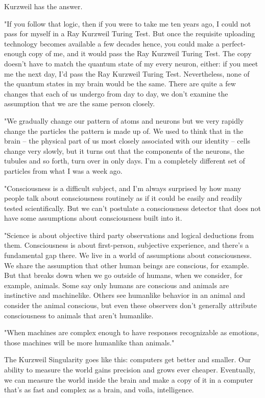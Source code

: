 Kurzweil has the answer.

"If you follow that logic, then if you were to take me ten years
ago, I could not pass for myself in a Ray Kurzweil Turing Test. But
once the requisite uploading technology becomes available a few
decades hence, you could make a perfect-enough copy of me, and it
would pass the Ray Kurzweil Turing Test. The copy doesn't have to
match the quantum state of my every neuron, either: if you meet me
the next day, I'd pass the Ray Kurzweil Turing Test. Nevertheless,
none of the quantum states in my brain would be the same. There are
quite a few changes that each of us undergo from day to day, we
don't examine the assumption that we are the same person closely.

"We gradually change our pattern of atoms and neurons but we very
rapidly change the particles the pattern is made up of. We used to
think that in the brain -- the physical part of us most closely
associated with our identity -- cells change very slowly, but it
turns out that the components of the neurons, the tubules and so
forth, turn over in only days. I'm a completely different set of
particles from what I was a week ago.

"Consciousness is a difficult subject, and I'm always surprised by
how many people talk about consciousness routinely as if it could
be easily and readily tested scientifically. But we can't postulate
a consciousness detector that does not have some assumptions about
consciousness built into it.

"Science is about objective third party observations and logical
deductions from them. Consciousness is about first-person,
subjective experience, and there's a fundamental gap there. We live
in a world of assumptions about consciousness. We share the
assumption that other human beings are conscious, for example. But
that breaks down when we go outside of humans, when we consider,
for example, animals. Some say only humans are conscious and
animals are instinctive and machinelike. Others see humanlike
behavior in an animal and consider the animal conscious, but even
these observers don't generally attribute consciousness to animals
that aren't humanlike.

"When machines are complex enough to have responses recognizable as
emotions, those machines will be more humanlike than animals."

The Kurzweil Singularity goes like this: computers get better and
smaller. Our ability to measure the world gains precision and grows
ever cheaper. Eventually, we can measure the world inside the brain
and make a copy of it in a computer that's as fast and complex as a
brain, and voila, intelligence.

